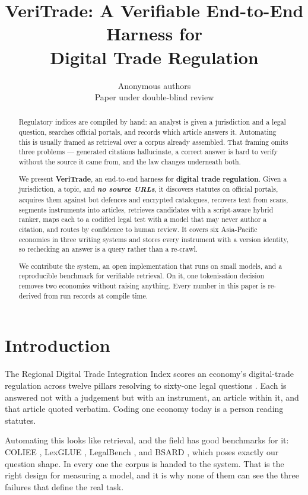 \documentclass{article}
\title{VeriTrade: A Verifiable End-to-End Harness for\\Digital Trade Regulation}
\author{Anonymous authors \\ Paper under double-blind review}
\begin{document}
\maketitle

\begin{abstract}
Regulatory indices are compiled by hand: an analyst is given a jurisdiction and a
legal question, searches official portals, and records which article answers it.
Automating this is usually framed as retrieval over a corpus already assembled.
That framing omits three problems --- generated citations hallucinate, a correct
answer is hard to verify without the source it came from, and the law changes
underneath both.

We present \textbf{VeriTrade}, an end-to-end harness for \textbf{digital trade
regulation}. Given a jurisdiction, a topic, and \textbf{\emph{no source URLs}},
it discovers statutes on official portals, acquires them against bot defences and
encrypted catalogues, recovers text from scans, segments instruments into
articles, retrieves candidates with a script-aware hybrid ranker, maps each to a
codified legal test with a model that may never author a citation, and routes by
confidence to human review. It covers six Asia-Pacific economies in three writing
systems and stores every instrument with a version identity, so rechecking an
answer is a query rather than a re-crawl.

We contribute the system, an open implementation that runs on small models, and a
reproducible benchmark for verifiable retrieval. On it, one tokenisation decision
removes two economies without raising anything.  Every number in this
paper is re-derived from run records at compile time.
\end{abstract}

\section{Introduction}

The Regional Digital Trade Integration Index scores an economy's digital-trade
regulation across twelve pillars resolving to sixty-one legal questions
\citep{escap2024rdtii}. Each is answered not with a judgement but with an
instrument, an article within it, and that article quoted verbatim. Coding one
economy today is a person reading statutes.

Automating this looks like retrieval, and the field has good benchmarks for it:
COLIEE \citep{goebel2023coliee}, LexGLUE \citep{chalkidis2022lexglue}, LegalBench
\citep{guha2023legalbench}, and BSARD \citep{louis2022bsard}, which poses exactly
our question shape. In every one the corpus is handed to the system. That is the
right design for measuring a model, and it is why none of them can see the three
failures that define the real task.
\end{document}
